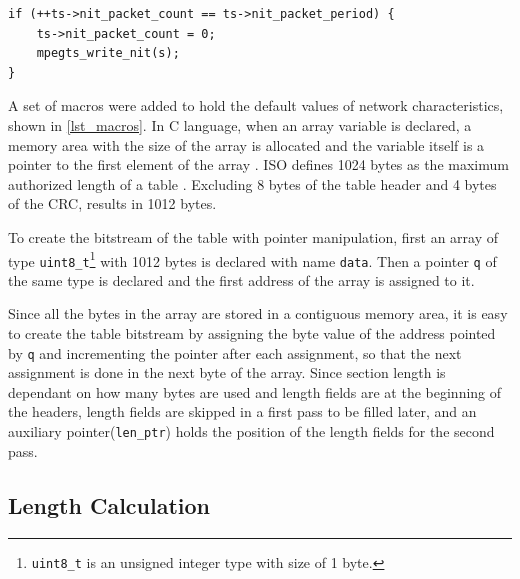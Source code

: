 \documentclass[
	12pt,				%
	openright,			%
	twoside,			%
	a4paper,			%
	brazil,
	french,				%
	english
	]{abntex2}
\begin{document}
\begin{lstlisting}[caption={Conditional call to \texttt{mpegts\hspace{0.1mm}\_\hspace{0.1mm}write\hspace{0.1mm}\_\hspace{0.1mm}nit()}.}, label={lst_write_table_call}]
if (++ts->nit_packet_count == ts->nit_packet_period) {
    ts->nit_packet_count = 0;
    mpegts_write_nit(s);
}
\end{lstlisting}

A set of macros were added to hold the default values of network characteristics, shown in \autoref{lst_macros}. In C language, when an array variable is declared, a memory area with the size of the array is allocated and the variable itself is a pointer to the first element of the array . ISO defines 1024 bytes as the maximum authorized length of a table . Excluding 8 bytes of the table header and 4 bytes of the CRC, results in 1012 bytes.

To create the bitstream of the table with pointer manipulation, first an array of type \texttt{uint8\hspace{0.1mm}\_\hspace{0.1mm}t}\footnote{\texttt{uint8\hspace{0.1mm}\_\hspace{0.1mm}t} is an unsigned integer type with size of 1 byte.} with 1012 bytes is declared with name \texttt{data}. Then a pointer \texttt{q} of the same type is declared and the first address of the array is assigned to it.

Since all the bytes in the array are stored in a contiguous memory area, it is easy to create the table bitstream by assigning the byte value of the address pointed by \texttt{q} and incrementing the pointer after each assignment, so that the next assignment is done in the next byte of the array. Since section length is dependant on how many bytes are used and length fields are at the beginning of the headers, length fields are skipped in a first pass to be filled later, and an auxiliary pointer(\texttt{len\hspace{0.1mm}\_\hspace{0.1mm}ptr}) holds the position of the length fields for the second pass. 

\subsection{Length Calculation}
\label{length_calc}
\end{document}
